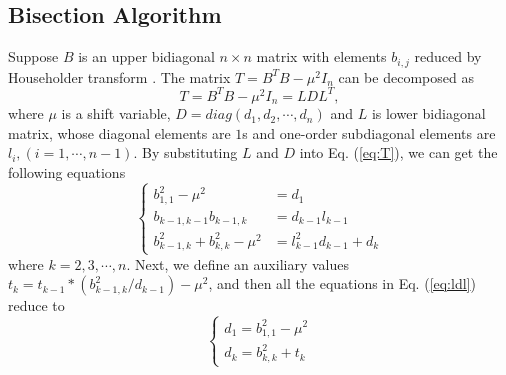 \subsection{Bisection Algorithm}\label{subsec:bisection}
\vspace{-0.1in}
Suppose $B$ is an upper bidiagonal $n \times n$ matrix with elements $b_{i,j}$ reduced by Householder transform \cite{10householder}.
The matrix $T = B^T B - \mu^2 I_n$ can be decomposed as
\begin{equation}
\label{eq:T}
T = B^T B - \mu^2 I_n = L D L^T ,
\end{equation}
where $\mu$ is a shift variable, $D=diag(d_1,d_2,\cdots,d_n)$ and $L$ is lower bidiagonal matrix, whose diagonal elements are $1$s and one-order subdiagonal elements are $l_{i}, (i=1,\cdots,n-1)$.
By substituting $L$ and $D$ into Eq. (\ref{eq:T}), we can get the following equations
\[ \left \{ \begin{aligned}
b_{1,1}^2 - \mu^2 &= d_1\\
b_{k-1,k-1} b_{k-1,k} &= d_{k-1} l_{k-1}\\
b_{k-1,k}^2 + b_{k,k}^2 - \mu^2 &= l_{k-1}^2 d_{k-1} + d_k
\end{aligned} \right . \label{eq:ldl} \]
where $k = 2,3,\cdots,n$.
Next, we define an auxiliary values $t_{k} = t_{k-1} * (b_{k-1,k}^2 / d_{k-1}) - \mu^2$, and then all the equations in Eq. (\ref{eq:ldl}) reduce to
\begin{equation}
\left \{
\begin{aligned}
d_1 = b_{1,1}^2 - \mu^2 \\
d_k = b_{k,k}^2 + t_{k}
\end{aligned}
\right .
\label{eq:negcount}
\end{equation}

